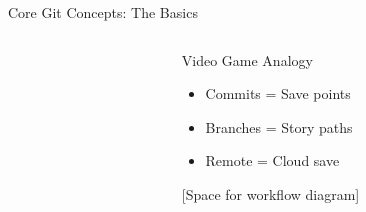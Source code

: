 \documentclass[aspectratio=169]{beamer}
\begin{document}
\begin{frame}{Core Git Concepts: The Basics}
\begin{columns}
\begin{column}{0.48\textwidth}
\begin{center}
\begin{tikzpicture}
      \end{tikzpicture}
      \end{center}
    \end{column}
    
    \begin{column}{0.48\textwidth}
      \begin{exampleblock}{Video Game Analogy}
        \begin{itemize}
          \item Commits = Save points
          \item Branches = Story paths
          \item Remote = Cloud save
        \end{itemize}
      \end{exampleblock}
      
      \vspace{1em}
      
      \begin{center}
        [Space for workflow diagram]
      \end{center}
    \end{column}
  \end{columns}
\end{frame}
\end{document}
